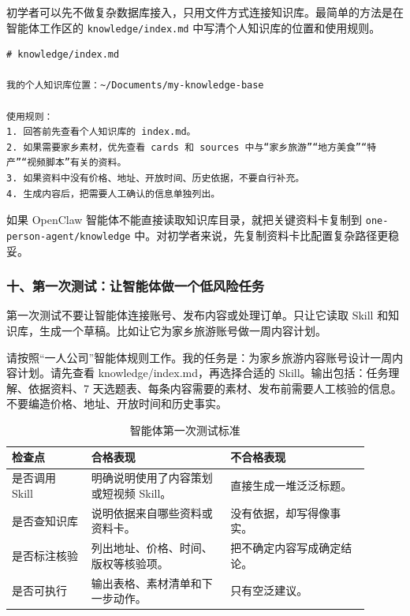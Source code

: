 初学者可以先不做复杂数据库接入，只用文件方式连接知识库。最简单的方法是在智能体工作区的 \texttt{knowledge/index.md} 中写清个人知识库的位置和使用规则。

\begin{verbatim}
# knowledge/index.md

我的个人知识库位置：~/Documents/my-knowledge-base

使用规则：
1. 回答前先查看个人知识库的 index.md。
2. 如果需要家乡素材，优先查看 cards 和 sources 中与“家乡旅游”“地方美食”“特产”“视频脚本”有关的资料。
3. 如果资料中没有价格、地址、开放时间、历史依据，不要自行补充。
4. 生成内容后，把需要人工确认的信息单独列出。
\end{verbatim}

如果 OpenClaw 智能体不能直接读取知识库目录，就把关键资料卡复制到 \texttt{one-person-agent/knowledge} 中。对初学者来说，先复制资料卡比配置复杂路径更稳妥。

\subsubsection*{十、第一次测试：让智能体做一个低风险任务}

第一次测试不要让智能体连接账号、发布内容或处理订单。只让它读取 Skill 和知识库，生成一个草稿。比如让它为家乡旅游账号做一周内容计划。

\begin{tcolorbox}[promptbox]
请按照“一人公司”智能体规则工作。我的任务是：为家乡旅游内容账号设计一周内容计划。请先查看 knowledge/index.md，再选择合适的 Skill。输出包括：任务理解、依据资料、7 天选题表、每条内容需要的素材、发布前需要人工核验的信息。不要编造价格、地址、开放时间和历史事实。
\end{tcolorbox}

\begin{table}[H]
\centering
\caption{智能体第一次测试标准}
\label{tab:agent-first-test-standard}
\begin{tabular}{p{0.20\linewidth} p{0.35\linewidth} p{0.35\linewidth}}
\toprule
\textbf{检查点} & \textbf{合格表现} & \textbf{不合格表现} \\
\midrule
是否调用 Skill & 明确说明使用了内容策划或短视频 Skill。 & 直接生成一堆泛泛标题。 \\
是否查知识库 & 说明依据来自哪些资料或资料卡。 & 没有依据，却写得像事实。 \\
是否标注核验 & 列出地址、价格、时间、版权等核验项。 & 把不确定内容写成确定结论。 \\
是否可执行 & 输出表格、素材清单和下一步动作。 & 只有空泛建议。 \\
\bottomrule
\end{tabular}
\end{table}


